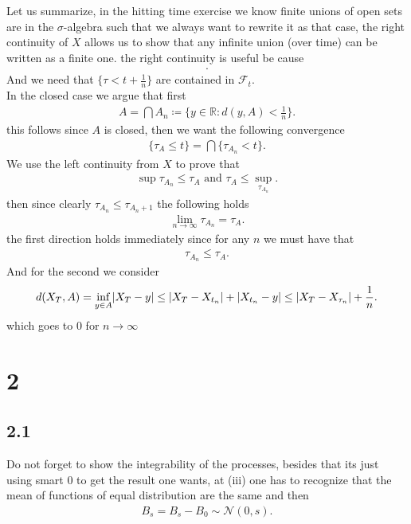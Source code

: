 Let us summarize, in the hitting time exercise we know finite unions of open sets are in the $\sigma$-algebra such that we always want to rewrite it as that case,
the right continuity of $X$ allows us to show that any infinite union (over time) can be written as a finite one. the right continuity is useful be cause 
\begin{align*}
  [1,2+\frac{1}{n}) \to [1,2]
.\end{align*}
And we need that $\{\tau  < t + \frac{1}{n}\}  $ are contained in $\mathcal{F}_t$. \\[1ex]
In the closed case we argue that first
\begin{align*}
  A = \bigcap A_n \coloneqq  \{y \in  \mathbb{R} : d(y,A) < \frac{1}{n}\}  
.\end{align*}
this follows since $A$ is closed, then we want the following convergence
\begin{align*}
  \{\tau_A \le  t\}  = \bigcap \{\tau_{A_n} < t\}  
.\end{align*}
We use the left continuity from $X$ to prove that 
\begin{align*}
  \sup \tau_{A_n} \le  \tau_A  \text{ and } \tau_A \le \sup_{\tau_{A_n}}
.\end{align*}
then since clearly $\tau_{A_n} \le  \tau_{A_n+1}$ the following holds
\begin{align*}
  \lim_{n \to \infty} \tau_{A_n} = \tau_A
.\end{align*}
the first direction holds immediately since for any $n$ we must have that
\begin{align*}
  \tau_{A_n} \le   \tau_A
.\end{align*}
And for the second we consider 
\begin{align*}
    d(X_T,A) = \inf_{y \in  A} \lvert X_T - y\rvert \le  \lvert X_T -X_{t_n}\rvert + \lvert X_{t_n} - y\rvert  \le  \lvert X_T -X_{\tau _n}\rvert + \frac{1}{n}
.\end{align*}
which goes to $0$ for $n \to \infty$

\section*{2}
\subsection*{2.1}
Do not forget to show the integrability of the processes, besides that its just using smart 0 to get the result one wants,
at (iii) one has to recognize that the mean of functions of equal distribution are the same and then 
\begin{align*}
  B_s  =B_s - B_0 \sim \mathcal{N}(0,s)
.\end{align*}
